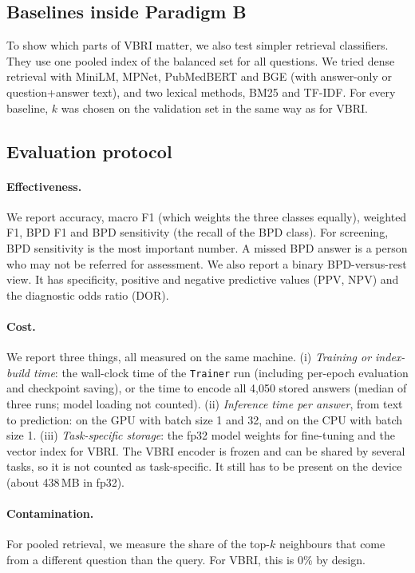 \documentclass[11pt]{article}
\newcommand{\vbri}{VBRI}
\begin{document}
\subsection{Baselines inside Paradigm B}

To show which parts of \vbri{} matter, we also test simpler retrieval classifiers. They use one
pooled index of the balanced set for all questions. We tried dense retrieval with MiniLM, MPNet,
PubMedBERT and BGE (with answer-only or question+answer text), and two lexical methods, BM25 and
TF-IDF. For every baseline, $k$ was chosen on the validation set in the same way as for \vbri{}.

\subsection{Evaluation protocol}

\paragraph{Effectiveness.} We report accuracy, macro F1 (which weights the three classes equally),
weighted F1, BPD F1 and BPD sensitivity (the recall of the BPD class). For screening, BPD
sensitivity is the most important number. A missed BPD answer is a person who may not be referred
for assessment. We also report a binary BPD-versus-rest view. It has specificity, positive and
negative predictive values (PPV, NPV) and the diagnostic odds ratio (DOR).

\paragraph{Cost.} We report three things, all measured on the same machine. (i) \emph{Training or
index-build time}: the wall-clock time of the \texttt{Trainer} run (including per-epoch evaluation
and checkpoint saving), or the time to encode all 4,050 stored answers (median of three runs; model
loading not counted). (ii) \emph{Inference time per answer}, from text to prediction: on the GPU with
batch size 1 and 32, and on the CPU with batch size 1. (iii) \emph{Task-specific storage}: the fp32
model weights for fine-tuning and the vector index for \vbri{}. The \vbri{} encoder is frozen and can
be shared by several tasks, so it is not counted as task-specific. It still has to be present on the
device (about 438\,MB in fp32).

\paragraph{Contamination.} For pooled retrieval, we measure the share of the top-$k$ neighbours that
come from a different question than the query. For \vbri{}, this is 0\% by design.
\end{document}
